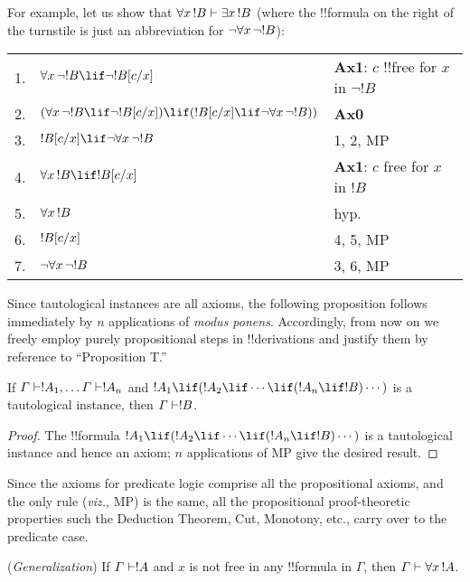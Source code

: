 \documentclass[../../include/open-logic-section]{subfiles}
\begin{document}
For example, let us show that $\lforall[x][!B] \Proves \lexists[x][!B]$
(where the !!{formula} on the right of the turnstile is just an
abbreviation for $\lnot \lforall[x][\lnot !B]$):

\begin{tabular}{rll}
 1. & $\lforall[x][\lnot !B] \lif \lnot \Subst{!B}{c}{x}$ &
 \textbf{Ax1}: $c$ !!{free for} $x$ in $\lnot !B$ \\
 2. &  $(\lforall[x][\lnot !B] \lif \lnot \Subst{!B}{c}{x}) \lif
 (\Subst{!B}{c}{x} \lif \lnot\lforall[x][\lnot !B]))$ & \textbf{Ax0}\\
 3. & $\Subst{!B}{c}{x} \lif \lnot\lforall[x][\lnot !B]$ & 1, 2, MP\\
 4. & $\lforall[x][!B] \lif \Subst{!B}{c}{x}$ & \textbf{Ax1}: $c$ free
 for $x$ in $!B$ \\
 5. & $\lforall[x][!B]$ & hyp. \\
 6. & $!B[c/x]$ & 4, 5, MP \\
 7. & $\lnot \lforall[x][\lnot !B]$ & 3, 6, MP
\end{tabular}

\medskip\noindent
Since tautological instances are all axioms, the following proposition
follows immediately by $n$ applications of \emph{modus
  ponens}. Accordingly, from now on we freely employ purely
propositional steps in !!{derivation}s and justify them by reference to
``Proposition T.''

\begin{prop}
  If $\Gamma \Proves !A_1 ,\ldots \Gamma \Proves !A_n$ and
  $!A_1 \lif (!A_2 \lif \cdots \lif(!A_n
  \lif !B) \cdots )$ is a tautological instance, then $\Gamma
  \Proves !B$.
\end{prop}

\begin{proof}
  The !!{formula}   $!A_1 \lif (!A_2 \lif \cdots \lif(!A_n
  \lif !B) \cdots )$ is a tautological instance and hence an
  axiom; $n$ applications of MP give the desired result.
\end{proof}

\begin{explain}
  Since the axioms for predicate logic comprise all the propositional
  axioms, and the only rule (\emph{viz.}, MP) is the same, all the
  propositional proof-theoretic properties such the Deduction Theorem,
  Cut, Monotony, etc., carry over to the predicate case.
\end{explain}

\begin{thm}
  (\emph{Generalization}) If $\Gamma \Proves !A$ and $x$ is not free
  in any !!{formula} in $\Gamma$, then $\Gamma \Proves \lforall[x][!A]$.
\end{thm}
\end{document}
